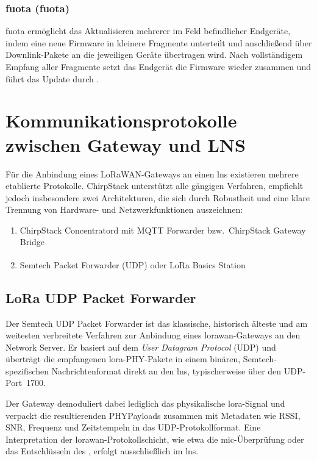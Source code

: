 \subsubsection{\acl{fuota} (\acs{fuota})}
	\ac{fuota} ermöglicht das Aktualisieren mehrerer im Feld befindlicher Endgeräte, indem eine neue Firmware in kleinere Fragmente unterteilt und anschlie{\ss}end über Downlink-Pakete an die jeweiligen Geräte übertragen wird. Nach vollständigem Empfang aller Fragmente setzt das Endgerät die Firmware wieder zusammen und führt das Update durch \cite{USMB:2022}.



\section{Kommunikationsprotokolle zwischen Gateway und LNS}

	Für die Anbindung eines LoRaWAN-Gateways an einen \ac{lns} existieren mehrere etablierte Protokolle. ChirpStack unterstützt alle gängigen Verfahren, empfiehlt jedoch insbesondere zwei Architekturen, die sich durch Robustheit und eine klare Trennung von Hardware- und Netzwerkfunktionen auszeichnen:

	\begin{enumerate}
		\item ChirpStack Concentratord mit MQTT Forwarder bzw.\ ChirpStack Gateway Bridge
		\item Semtech Packet Forwarder (UDP) oder LoRa Basics\textsuperscript{\texttrademark} Station
	\end{enumerate}

\subsection{LoRa UDP Packet Forwarder}

	Der Semtech UDP Packet Forwarder ist das klassische, historisch älteste und am weitesten verbreitete Verfahren zur Anbindung eines \acs{lorawan}-Gateways an den Network Server. Er basiert auf dem \textit{User Datagram Protocol} (UDP) und überträgt die empfangenen \acs{lora}-PHY-Pakete in einem binären, Semtech-spezifischen Nachrichtenformat direkt an den \acs{lns}, typischerweise über den UDP-Port~1700.

	Der Gateway demoduliert dabei lediglich das physikalische \acs{lora}-Signal und verpackt die resultierenden PHYPayloads zusammen mit Metadaten wie RSSI, SNR, Frequenz und Zeitstempeln in das UDP-Protokollformat. Eine Interpretation der \acs{lorawan}-Protokollschicht, wie etwa die \acs{mic}-Überprüfung oder das Entschlüsseln des , erfolgt ausschlie{\ss}lich im \acs{lns}.

